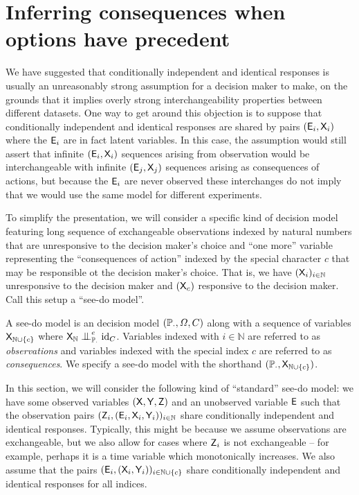 
\section[Precedented options]{Inferring consequences when options have precedent}\label{sec:precedent}

We have suggested that conditionally independent and identical responses is usually an unreasonably strong assumption for a decision maker to make, on the grounds that it implies overly strong interchangeability properties between different datasets. One way to get around this objection is to suppose that conditionally independent and identical responses are shared by pairs $(\mathsf{E}_i,\mathsf{X}_{i})$ where the $\mathsf{E}_i$ are in fact latent variables. In this case, the assumption would still assert that infinite $(\mathsf{E}_i,\mathsf{X}_{i})$ sequences arising from observation would be interchangeable with infinite $(\mathsf{E}_j,\mathsf{X}_{j})$ sequences arising as consequences of actions, but because the $\mathsf{E}_i$ are never observed these interchanges do not imply that we would use the same model for different experiments.

To simplify the presentation, we will consider a specific kind of decision model featuring long sequence of exchangeable observations indexed by natural numbers that are unresponsive to the decision maker's choice and ``one more'' variable representing the ``consequences of action'' indexed by the special character $c$ that may be responsible ot the decision maker's choice. That is, we have $(\mathsf{X}_i)_{i\in \mathbb{N}}$ unresponsive to the decision maker and $(\mathsf{X}_c)$ responsive to the decision maker. Call this setup a ``see-do model''.

\begin{definition}
A see-do model is an decision model $(\mathbb{P}_\cdot,\Omega,C)$ along with a sequence of variables $\mathsf{X}_{\mathbb{N}\cup\{c\}}$ where $\RV{X}_{\mathbb{N}}\CI^e_{\prob{P}_\cdot} \mathrm{id}_C$. Variables indexed with $i\in \mathbb{N}$ are referred to as \emph{observations} and variables indexed with the special index $c$ are referred to as \emph{consequences}. We specify a see-do model with the shorthand $(\mathbb{P}_\cdot,\mathsf{X}_{\mathbb{N}\cup\{c\}})$.
\end{definition}

In this section, we will consider the following kind of ``standard'' see-do model: we have some observed variables $(\mathsf{X},\mathsf{Y},\mathsf{Z})$ and an unobserved variable $\mathsf{E}$ such that the observation pairs $(\mathsf{Z}_{i},(\mathsf{E}_i,\mathsf{X}_i,\mathsf{Y}_i))_{i\in \mathbb{N}}$ share conditionally independent and identical responses. Typically, this might be because we assume observations are exchangeable, but we also allow for cases where $\mathsf{Z}_i$ is not exchangeable -- for example, perhaps it is a time variable which monotonically increases. We also assume that the pairs $(\mathsf{E}_i,(\mathsf{X}_i,\mathsf{Y}_i))_{i\in\mathbb{N}\cup\{c\}}$ share conditionally independent and identical responses for all indices.

